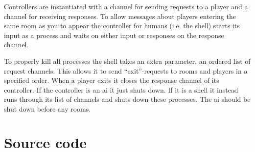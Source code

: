 \documentclass[a4paper, 11pt]{article}
\begin{document}
Controllers are instantiated with a channel for sending requests to a player and a channel for receiving responses. To allow messages about players entering the same room as you to appear the controller for humans (i.e. the shell) starts its input as a process and waits on either input or responses on the response channel.

To properly kill all processes the shell takes an extra parameter, an ordered list of request channels. This allows it to send ``exit''-requests to rooms and players in a specified order. When a player exits it closes the response channel of its controller. If the controller is an ai it just shuts down. If it is a shell it instead runs through its list of channels and shuts down these processes. The ai should be shut down before any rooms.


\appendix
\section{Source code} %
\label{sec:source_code}

\inputminted[fontsize=\scriptsize, frame=topline, label=main.go, linenos=true]{go}{../src/main.go}

\inputminted[fontsize=\scriptsize, frame=topline, label=xmpmud/structs.go, linenos=true]{go}{../src/xmpmud/structs.go}

\inputminted[fontsize=\scriptsize, frame=topline, label=xmpmud/controller.go, linenos=true]{go}{../src/xmpmud/controller.go}

\inputminted[fontsize=\scriptsize, frame=topline, label=xmpmud/player.go, linenos=true]{go}{../src/xmpmud/player.go}

\inputminted[fontsize=\scriptsize, frame=topline, label=xmpmud/room.go, linenos=true]{go}{../src/xmpmud/room.go}
\end{document}
